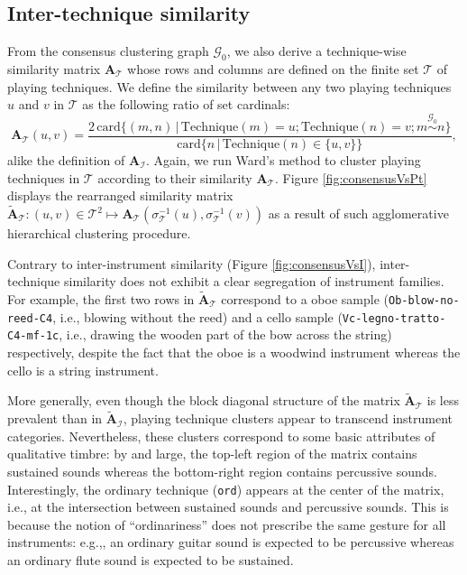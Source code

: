 \documentclass{bmcart}
\makeatletter
\newcommand*{\eg}{e.g.,\@\xspace}
\newcommand*{\ie}{i.e.,\@\xspace}
\newcommand{\Card}{\mathrm{card}}
\makeatother
\begin{document}
\subsection*{Inter-technique similarity}
From the consensus clustering graph $\mathcal{G}_0$, we also derive a technique-wise similarity matrix $\mathbf{A}_{\mathcal{T}}$ whose rows and columns are defined on the finite set $\mathcal{T}$ of playing techniques.
We define the similarity between any two playing techniques $u$ and $v$ in $\mathcal{T}$ as the following ratio of set cardinals:
\[
\mathbf{A}_{\mathcal{T}}(u,v) = \dfrac{
2\,\Card \big\{ (m, n) \,\vert\, \mathrm{Technique}(m)=u ; \mathrm{Technique}(n)=v ; m \overset{\mathcal{G}_0}{\sim} n \big\}
}{
\Card \big\{n \,\vert\, \mathrm{Technique}(n) \in \{ u, v \} \big\}
},
\]
alike the definition of $\mathbf{A}_{\mathcal{I}}$.
Again, we run Ward's method to cluster playing techniques in $\mathcal{T}$ according to their similarity $\mathbf{A}_{\mathcal{T}}$.
Figure \ref{fig:consensusVsPt} displays the rearranged similarity matrix $\widetilde{\mathbf{A}}_{\mathcal{T}} : (u,v)\in \mathcal{T}^2 \mapsto \mathbf{A}_{\mathcal{T}}(\sigma_{\mathcal{T}}^{-1}(u), \sigma_{\mathcal{T}}^{-1}(v))$ as a result of such agglomerative hierarchical clustering procedure.

Contrary to inter-instrument similarity (Figure \ref{fig:consensusVsI}), inter-technique similarity does not exhibit a clear segregation of instrument families.
For example, the first two rows in $\widetilde{\mathbf{A}}_{\mathcal{T}}$ correspond to a oboe sample (\texttt{Ob-blow-no-reed-C4}, \ie{} blowing without the reed) and a cello sample (\texttt{Vc-legno-tratto-C4-mf-1c}, \ie{} drawing the wooden part of the bow across the string) respectively, despite the fact that the oboe is a woodwind instrument whereas the cello is a string instrument.

More generally, even though the block diagonal structure of the matrix $\widetilde{\mathbf{A}}_{\mathcal{T}}$ is less prevalent than in $\widetilde{\mathbf{A}}_{\mathcal{I}}$, playing technique clusters appear to transcend instrument categories.
Nevertheless, these clusters correspond to some basic attributes of qualitative timbre: by and large, the top-left region of the matrix contains sustained sounds whereas the bottom-right region contains percussive sounds.
Interestingly, the ordinary technique (\texttt{ord}) appears at the center of the matrix, \ie{} at the intersection between sustained sounds and percussive sounds.
This is because the notion of ``ordinariness'' does not prescribe the same gesture for all instruments: \eg{}, an ordinary guitar sound is expected to be percussive whereas an ordinary flute sound is expected to be sustained.
\end{document}
